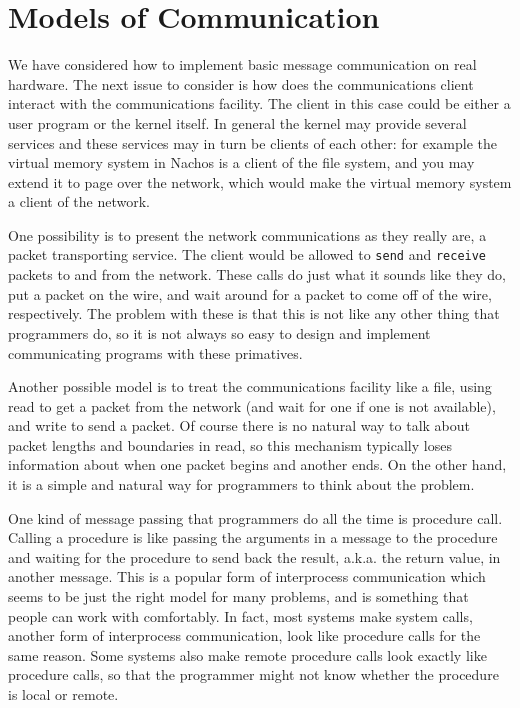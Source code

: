 \section{Models of Communication}

We have considered how to implement basic message communication on real
hardware.  The next issue to consider is how does the
communications client interact with the communications facility.
The client in this case could be either a user program or the kernel
itself.  In general the kernel may provide several services and these
services may in turn be clients of each other: for example the virtual
memory system in Nachos is a client of the file system, and you may
extend it to page over the network, which would make the virtual memory
system a client of the network.

One possibility is to present the network communications as they
really are, a packet transporting service.  The client would be allowed
to {\tt send} and {\tt receive} packets to and from the network.
These calls do just what it sounds like they do, put
a packet on the wire, and wait around for a packet to come off
of the wire, respectively.
The problem with these is that this is not like any other thing that
programmers do, so it is not always so easy to design and implement
communicating programs with these primatives.

Another possible model is to treat the communications
facility like a file, using read to get a packet from the network (and
wait for one if one is not available), and write to send a packet.  Of course
there is no natural way to talk about packet lengths and boundaries in read,
so this mechanism typically loses information about when one packet begins
and another ends.  On the other hand, it is a simple and natural way for
programmers to think about the problem.

One kind of message passing that programmers do all the time is procedure
call.  Calling a procedure is like passing the arguments in a message to
the procedure and waiting for the procedure to send back the result,
a.k.a. the return value,
in another message.  This is a popular form of interprocess
communication which seems to be just the right model for many problems, and
is something that people can work with comfortably.  In fact, most systems
make system calls, another form of interprocess communication, look like
procedure calls for the same reason.  Some systems also make remote procedure
calls look exactly like procedure calls, so that the programmer might not
know whether the procedure is local or remote.

